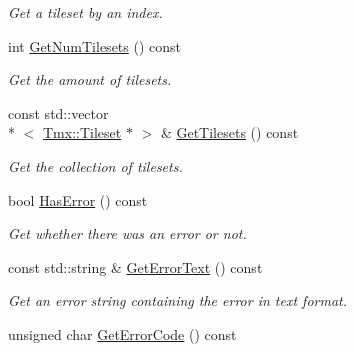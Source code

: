 \begin{DoxyCompactItemize}
\begin{DoxyCompactList}\small\item\em Get a tileset by an index. \end{DoxyCompactList}\item 
\hypertarget{classTmx_1_1Map_ace78d988082829b6ddbd14f9cb7b848b}{int \hyperlink{classTmx_1_1Map_ace78d988082829b6ddbd14f9cb7b848b}{Get\-Num\-Tilesets} () const }\label{classTmx_1_1Map_ace78d988082829b6ddbd14f9cb7b848b}

\begin{DoxyCompactList}\small\item\em Get the amount of tilesets. \end{DoxyCompactList}\item 
\hypertarget{classTmx_1_1Map_a04a2b25c901724a24d24ff27e205533d}{const std\-::vector\\*
$<$ \hyperlink{classTmx_1_1Tileset}{Tmx\-::\-Tileset} $\ast$ $>$ \& \hyperlink{classTmx_1_1Map_a04a2b25c901724a24d24ff27e205533d}{Get\-Tilesets} () const }\label{classTmx_1_1Map_a04a2b25c901724a24d24ff27e205533d}

\begin{DoxyCompactList}\small\item\em Get the collection of tilesets. \end{DoxyCompactList}\item 
\hypertarget{classTmx_1_1Map_af6e7c1d916c6da7b407df74a0ff49d99}{bool \hyperlink{classTmx_1_1Map_af6e7c1d916c6da7b407df74a0ff49d99}{Has\-Error} () const }\label{classTmx_1_1Map_af6e7c1d916c6da7b407df74a0ff49d99}

\begin{DoxyCompactList}\small\item\em Get whether there was an error or not. \end{DoxyCompactList}\item 
\hypertarget{classTmx_1_1Map_a88ea91dee43fedf004b5a284feda1299}{const std\-::string \& \hyperlink{classTmx_1_1Map_a88ea91dee43fedf004b5a284feda1299}{Get\-Error\-Text} () const }\label{classTmx_1_1Map_a88ea91dee43fedf004b5a284feda1299}

\begin{DoxyCompactList}\small\item\em Get an error string containing the error in text format. \end{DoxyCompactList}\item 
\hypertarget{classTmx_1_1Map_a67421419f5b9ffb2d260dbcd89fd42b5}{unsigned char \hyperlink{classTmx_1_1Map_a67421419f5b9ffb2d260dbcd89fd42b5}{Get\-Error\-Code} () const }\label{classTmx_1_1Map_a67421419f5b9ffb2d260dbcd89fd42b5}


\end{DoxyCompactItemize}
